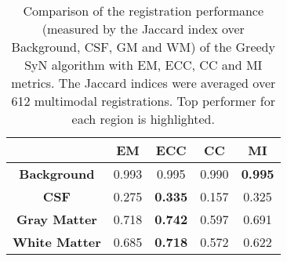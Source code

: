 \begin{table}[htbp]
  \centering
  {\small
    \begin{tabular}{ccccc}
    \toprule
          & \textbf{EM} & \textbf{ECC} & \textbf{CC} & \textbf{MI} \\
    \midrule
    \textbf{Background} & 0.993 & 0.995 & 0.990 & \textbf{0.995} \\
    \textbf{CSF} & 0.275 & \textbf{0.335} & 0.157 & 0.325 \\
    \textbf{Gray Matter} & 0.718 & \textbf{0.742} & 0.597 & 0.691 \\
    \textbf{White Matter} & 0.685 & \textbf{0.718} & 0.572 & 0.622 \\
    \bottomrule
    \end{tabular}}%
  \caption{Comparison of the registration performance (measured by the Jaccard index over Background, CSF, GM and WM) of the Greedy SyN algorithm with EM, ECC, CC and MI metrics.
The Jaccard indices were averaged over 612 multimodal registrations. Top performer for each region is highlighted.}
  \label{tab:multimodal_results_segTri_fill}%
\end{table}%
